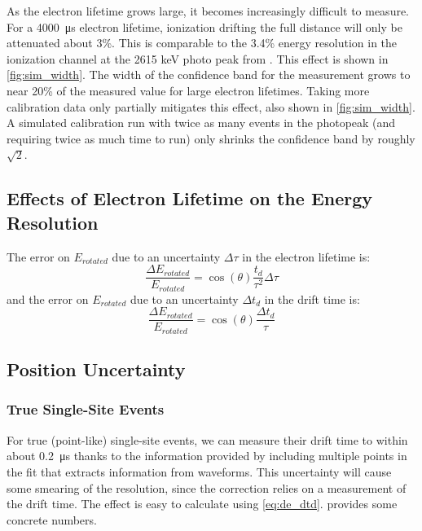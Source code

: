 \documentclass[herrin-thesis.tex]{subfiles}
\begin{document}
As the electron lifetime grows large, it becomes increasingly difficult to measure. For a  \SI{4000}{\micro\second}  electron lifetime, ionization drifting the full distance will only be attenuated about 3\%. This is comparable to the 3.4\% energy resolution in the ionization channel at the 2615 keV photo peak from . This effect is shown in \cref{fig:sim_width}. The width of the confidence band for the measurement grows to near 20\% of the measured value for large electron lifetimes. Taking more calibration data only partially mitigates this effect, also shown in \cref{fig:sim_width}. A simulated calibration run with twice as many events in the photopeak (and requiring twice as much time to run) only shrinks the confidence band by roughly \(\sqrt{2}\).

\subsection{Effects of Electron Lifetime on the Energy Resolution}

The error on \(E_{rotated}\) due to an uncertainty \(\Delta\tau\) in the electron lifetime is:
\begin{equation}
\frac{\Delta E_{rotated}}{E_{rotated}} = \cos(\theta) \frac{t_d}{\tau^2}\Delta\tau
\label{eq:de_dtau}
\end{equation}
and the error on \(E_{rotated}\) due to an uncertainty \(\Delta t_d\) in the drift time is:
\begin{equation}
\frac{\Delta E_{rotated}}{E_{rotated}} = \cos(\theta) \frac{\Delta t_d}{\tau}
\label{eq:de_dtd}
\end{equation}


\subsection{Position Uncertainty}
\subsubsection{True Single-Site Events}
For true (point-like) single-site events, we can measure their drift time to within about \SI{0.2}{\micro\second} thanks to the information provided by including multiple points in the fit that extracts information from waveforms. This uncertainty will cause some smearing of the resolution, since the correction relies on a measurement of the drift time. The effect is easy to calculate using \cref{eq:de_dtd}.  provides some concrete numbers.
\end{document}
